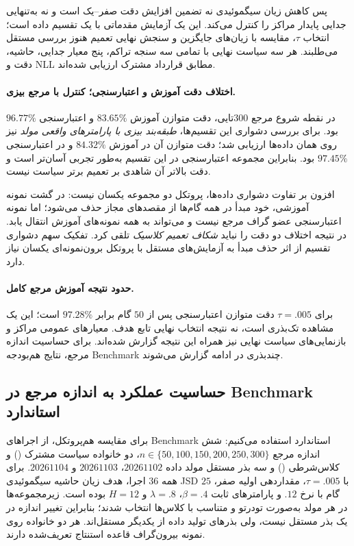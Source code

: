 پس کاهش زیان سیگموئیدی نه تضمین افزایش دقت صفر--یک است و نه به‌تنهایی جدایی پایدار مراکز را کنترل می‌کند. این یک آزمایش مقدماتی با یک تقسیم داده است؛ انتخاب $\tau$، مقایسه با زیان‌های جایگزین و سنجش نهایی تعمیم هنوز بررسی مستقل می‌طلبند. هر سه سیاست نهایی با تمامی سه سنجه تراکم، پنج معیار جدایی، حاشیه، دقت و NLL مطابق قرارداد مشترک ارزیابی شده‌اند.



\paragraph{اختلاف دقت آموزش و اعتبارسنجی؛ کنترل با مرجع بیزی.}
در نقطه شروع مرجع $300$تایی، دقت متوازن آموزش
$83.65\%$ و اعتبارسنجی $96.77\%$ بود.
برای بررسی دشواری این تقسیم‌ها، \emph{طبقه‌بند بیزی با
پارامترهای واقعی مولد} نیز روی همان داده‌ها ارزیابی شد؛
دقت متوازن آن در آموزش $84.32\%$ و در اعتبارسنجی
$97.45\%$ بود. بنابراین مجموعه اعتبارسنجی در این
تقسیم به‌طور تجربی آسان‌تر است و دقت بالاتر آن
شاهدی بر تعمیم برتر سیاست نیست.

افزون بر تفاوت دشواری داده‌ها، پروتکل دو مجموعه
یکسان نیست: در گشت نمونه آموزشی، خود مبدأ در همه
گام‌ها از مقصدهای مجاز حذف می‌شود؛ اما نمونه
اعتبارسنجی عضو گراف مرجع نیست و می‌تواند به همه
نمونه‌های آموزش انتقال یابد. در نتیجه اختلاف دو دقت
را نباید \emph{شکاف تعمیم کلاسیک} تلقی کرد.
تفکیک سهم دشواری تقسیم از اثر حذف مبدأ به آزمایش‌های
مستقل با پروتکل برون‌نمونه‌ای یکسان نیاز دارد.

\paragraph{حدود نتیجه آموزش مرجع کامل.}
برای $\tau=.005$ دقت متوازن اعتبارسنجی پس از $50$ گام برابر $97.28\%$ است؛ این یک مشاهده تک‌بذری است، نه نتیجه انتخاب نهایی تابع هدف. معیارهای عمومی مراکز و بازنمایی‌های سیاست نهایی نیز همراه این نتیجه گزارش شده‌اند. برای حساسیت اندازه مرجع، نتایج هم‌بودجه Benchmark چندبذری در ادامه گزارش می‌شوند.

\subsection{حساسیت عملکرد به اندازه مرجع در Benchmark استاندارد}
\label{subsec:ch4-margin-train-size-sensitivity}
برای مقایسه هم‌پروتکل، از اجراهای Benchmark استاندارد استفاده می‌کنیم: شش اندازه مرجع $n\in\{50,100,150,200,250,300\}$، دو خانواده سیاست مشترک () و کلاس‌شرطی () و سه بذر مستقل مولد داده $20261102$، $20261103$ و $20261104$. برای همه $36$ اجرا، هدف زیان حاشیه سیگموئیدی JSD با $\tau=.005$، مقداردهی اولیه صفر، $25$ گام  با نرخ $.12$ و پارامترهای ثابت $\beta=.4$، $\lambda=.8$ و $H=12$ بوده است. زیرمجموعه‌ها در هر مولد به‌صورت تو‌در‌تو و متناسب با کلاس‌ها انتخاب شدند؛ بنابراین تغییر اندازه در یک بذر مستقل نیست، ولی بذرهای تولید داده از یکدیگر مستقل‌اند. هر دو خانواده روی نمونه بیرون‌گراف قاعده استنتاج تعریف‌شده دارند.

